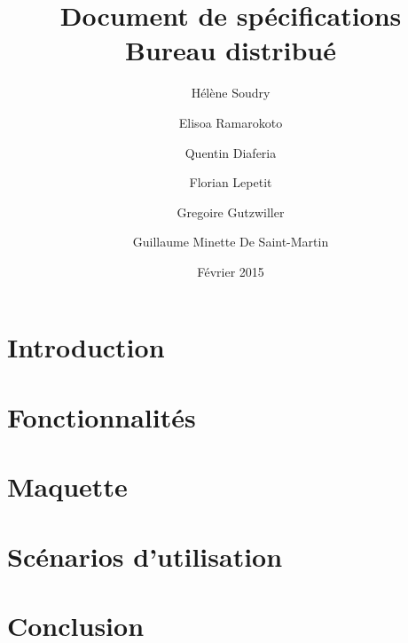 \documentclass[a4paper, 12pt]{report}
\title{Document de spécifications \\ Bureau distribué}
\author{Hélène Soudry \and Elisoa Ramarokoto \and Quentin Diaferia \and Florian Lepetit \and Gregoire Gutzwiller \and Guillaume Minette De Saint-Martin}
\date{Février 2015}
\begin{document}
\maketitle
\tableofcontents
\chapter*{Introduction}

\chapter{Fonctionnalités}

\chapter{Maquette}

\chapter{Scénarios d'utilisation}

\chapter*{Conclusion}

\end{document}
